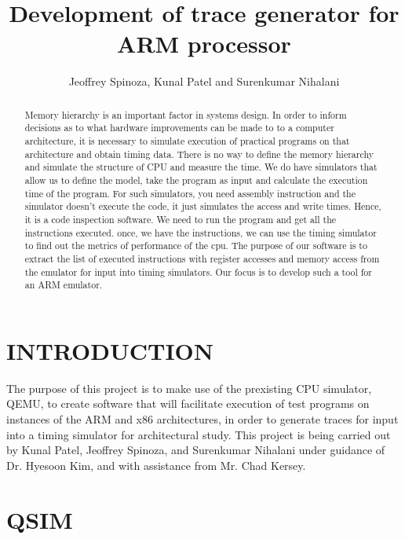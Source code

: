 \documentclass[letterpaper,10pt,twocolumn]{article}
\title{Development of trace generator for ARM processor}
\author{Jeoffrey Spinoza, Kunal Patel and Surenkumar Nihalani}
\begin{document}
\maketitle
\begin{abstract}
Memory hierarchy is an important factor in systems design. In order to inform decisions as to what hardware improvements can be made to to a computer architecture, it is necessary to simulate execution of practical programs on that architecture and obtain timing data. There is no way to define the memory hierarchy and simulate the structure of CPU and measure the time. We do have simulators that allow us to define the model, take the program as input and calculate the execution time of the program. For such simulators, you need assembly instruction and the simulator doesn't execute the code, it just simulates the access and write times. Hence, it is a code inspection software. We need to run the program and get all the instructions executed. once, we have the instructions, we can use the timing simulator to find out the metrics of performance of the cpu. The purpose of our software is to extract the list of executed instructions with register accesses and memory access from the emulator for input into timing simulators. Our focus is to develop such a tool for an ARM emulator.
\end{abstract}
\section{INTRODUCTION}
The purpose of this project is to make use of the prexisting CPU simulator, QEMU, to create software that will facilitate execution of test programs on instances of the ARM and x86 architectures, in order to generate traces for input into a timing simulator for architectural study. This project is being carried out by Kunal Patel, Jeoffrey Spinoza, and Surenkumar Nihalani under guidance of Dr. Hyesoon Kim, and with assistance from Mr. Chad Kersey.
\section{QSIM}
\end{document}
